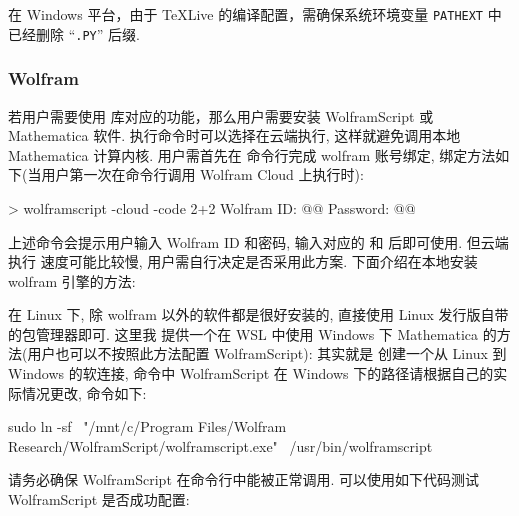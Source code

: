 \documentclass[
  hyper, lang=cn, 
  class=l3dox, 
]{../../zlatex/code/ztex}
\begin{document}
在 Windows 平台，由于 \TeX{}Live 的编译配置，需确保系统环境变量 \texttt{PATHEXT} 中已经删除 ``\texttt{.PY}'' 后缀. 

\vspace*{-.5em}
\subsubsection{Wolfram}
若用户需要使用  库对应的功能，那么用户需要安装 WolframScript 或
Mathematica 软件. 执行命令时可以选择在云端执行, 这样就避免调用本地 Mathematica 计算内核. 用户需首先在
命令行完成 wolfram 账号绑定, 绑定方法如下(当用户第一次在命令行调用 Wolfram Cloud 上执行时):
\begin{DocExample}[@@]
> wolframscript -cloud -code 2+2
Wolfram ID: @@
Password: @@
\end{DocExample}

上述命令会提示用户输入 Wolfram ID 和密码, 输入对应的  和  后即可使用. 但云端执行
速度可能比较慢, 用户需自行决定是否采用此方案. 下面介绍在本地安装 wolfram 引擎的方法:


在 Linux 下, 除 wolfram 以外的软件都是很好安装的, 直接使用 Linux 发行版自带的包管理器即可. 这里我
提供一个在 WSL 中使用 Windows 下 Mathematica 的方法(用户也可以不按照此方法配置 WolframScript): 其实就是
创建一个从 Linux 到 Windows 的软连接, 命令中 WolframScript 在 Windows 下的路径请根据自己的实际情况更改, 命令如下:

\begin{DocExample}[@@]
sudo ln -sf \
  "/mnt/c/Program Files/Wolfram Research/WolframScript/wolframscript.exe" \
  /usr/bin/wolframscript  
\end{DocExample}


请务必确保 WolframScript 在命令行中能被正常调用. 可以使用如下代码测试 WolframScript 是否成功配置: 
\end{document}
